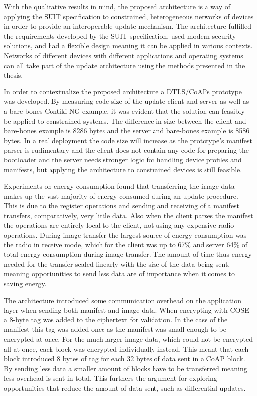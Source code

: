 \documentclass[0-thesis.tex]{subfiles}
\begin{document}
With the qualitative results in mind, the proposed architecture is a way of applying the
SUIT specification to constrained, heterogeneous networks of devices in order to provide
an interoperable update mechanism. The architecture fulfilled the requirements developed
by the SUIT specification, used modern security solutions, and had a flexible design
meaning it can be applied in various contexts. Networks of different devices with
different applications and operating systems can all take part of the update architecture
using the methods presented in the thesis.

In order to contextualize the proposed architecture a DTLS/CoAPs prototype was developed.
By measuring code size of the update client and server as well as a bare-bones Contiki-NG
example, it was evident that the solution can feasibly be applied to constrained systems.
The difference in size between the client and bare-bones example is 8286 bytes and the
server and bare-bones example is 8586 bytes. In a real deployment the code size will
increase as the prototype's manifest parser is rudimentary and the client does not contain
any code for preparing the bootloader and the server needs stronger logic for handling
device profiles and manifests, but applying the architecture to constrained devices is
still feasible.

Experiments on energy consumption found that transferring the image data makes up the vast
majority of energy consumed during an update procedure. This is due to the register
operations and sending and receiving of a manifest transfers, comparatively, very little
data. Also when the client parses the manifest the operations are entirely local to the
client, not using any expensive radio operations. During image transfer the largest source
of energy consumption was the radio in receive mode, which for the client was up to 67\%
and server 64\% of total energy consumption during image transfer. The amount of time thus
energy needed for the transfer scaled linearly with the size of the data being sent,
meaning opportunities to send less data are of importance when it comes to saving energy.

The architecture introduced some communication overhead on the application layer when
sending both manifest and image data. When encrypting with COSE a 8-byte tag was added to
the ciphertext for validation. In the case of the manifest this tag was added once as the
manifest was small enough to be encrypted at once. For the much larger image data, which
could not be encrypted all at once, each block was encrypted individually instead. This
meant that each block introduced 8 bytes of tag for each 32 bytes of data sent in a CoAP
block. By sending less data a smaller amount of blocks have to be transferred meaning less
overhead is sent in total. This furthers the argument for exploring opportunities that
reduce the amount of data sent, such as differential updates.
\end{document}
